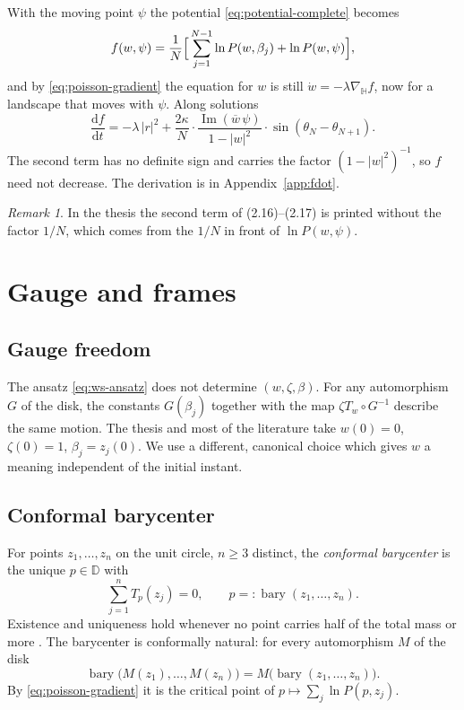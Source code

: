 \documentclass[a4paper,11pt]{article}
\newcommand{\conj}[1]{\overline{#1}}
\newcommand{\T}{T}                       %
\newcommand{\D}{\mathbb{D}}
\newcommand{\bary}{\operatorname{bary}}
\newcommand{\im}{\operatorname{Im}}
\newcommand{\dd}{\mathrm{d}}
\theoremstyle{remark}
\newtheorem{remark}{Remark}
\begin{document}
With the moving point $\psi$ the potential \eqref{eq:potential-complete} becomes
\begin{equation}\label{eq:potential}
f(w,\psi)=\frac1N\Bigl[\,\sum_{j=1}^{N-1}\ln P(w,\beta_j)+\ln P(w,\psi)\Bigr],
\end{equation}
and by \eqref{eq:poisson-gradient} the equation for $w$ is still
$\dot w=-\lambda\nabla_{\mathbb H}f$, now for a landscape that moves with
$\psi$. Along solutions
\begin{equation}\label{eq:f-dot}
\frac{\dd f}{\dd t}=-\lambda\,|r|^2
+\frac{2\kappa}{N}\cdot\frac{\im(\conj w\,\psi)}{1-|w|^2}\cdot\sin(\theta_N-\theta_{N+1}).
\end{equation}
The second term has no definite sign and carries the factor $(1-|w|^2)^{-1}$,
so $f$ need not decrease. The derivation is in Appendix~\ref{app:fdot}.

\begin{remark}
In the thesis the second term of (2.16)--(2.17) is printed without the factor
$1/N$, which comes from the $1/N$ in front of $\ln P(w,\psi)$.
\end{remark}

\section{Gauge and frames}\label{sec:gauge}

\subsection{Gauge freedom}

The ansatz \eqref{eq:ws-ansatz} does not determine $(w,\zeta,\beta)$. For any
automorphism $G$ of the disk, the constants $G(\beta_j)$ together with the map
$\zeta\T_w\circ G^{-1}$ describe the same motion. The thesis and most of the
literature take $w(0)=0$, $\zeta(0)=1$, $\beta_j=z_j(0)$. We use a different,
canonical choice which gives $w$ a meaning independent of the initial instant.

\subsection{Conformal barycenter}

For points $z_1,\dots,z_n$ on the unit circle, $n\ge3$ distinct, the
\emph{conformal barycenter} is the unique $p\in\D$ with
\begin{equation}\label{eq:barycenter}
\sum_{j=1}^{n}\T_p(z_j)=0,\qquad p=:\bary(z_1,\dots,z_n).
\end{equation}
Existence and uniqueness hold whenever no point carries half of the total mass
or more \cite{DouadyEarle1986}. The barycenter is conformally natural: for
every automorphism $M$ of the disk
\begin{equation}\label{eq:bary-equivariance}
\bary\bigl(M(z_1),\dots,M(z_n)\bigr)=M\bigl(\bary(z_1,\dots,z_n)\bigr).
\end{equation}
By \eqref{eq:poisson-gradient} it is the critical point of
$p\mapsto\sum_j\ln P(p,z_j)$.
\end{document}
